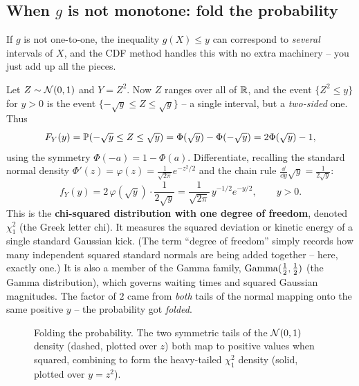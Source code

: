 \subsection{When $g$ is not monotone: fold the probability}

If $g$ is not one-to-one, the inequality $g(X)\le y$ can correspond to \emph{several}
intervals of $X$, and the CDF method handles this with no extra machinery -- you just add
up all the pieces.

\begin{example}[$Y = X^2$ for a standard normal -- the chi-squared]
\label{ch16:normal-square}
Let $Z \sim \Normal(0,1)$ and $Y = Z^2$. Now $Z$ ranges over all of $\R$, and the event
$\{Z^2 \le y\}$ for $y > 0$ is the event $\{-\sqrt{y} \le Z \le \sqrt{y}\}$ -- a single
interval, but a \emph{two-sided} one. Thus
\[
  F_Y(y) = \P(-\sqrt{y} \le Z \le \sqrt{y}) = \Phi(\sqrt{y}) - \Phi(-\sqrt{y})
         = 2\Phi(\sqrt{y}) - 1,
\]
using the symmetry $\Phi(-a) = 1 - \Phi(a)$. Differentiate, recalling
the standard normal density $\Phi'(z) = \varphi(z) = \tfrac{1}{\sqrt{2\pi}}e^{-z^2/2}$ and the chain rule
$\tfrac{\dd}{\dd y}\sqrt{y} = \tfrac{1}{2\sqrt{y}}$:
\[
  f_Y(y) = 2\,\varphi(\sqrt{y})\cdot \frac{1}{2\sqrt{y}}
         = \frac{1}{\sqrt{2\pi}}\, y^{-1/2} e^{-y/2}, \qquad y > 0.
\]
This is the \textbf{chi-squared distribution with one degree of freedom}, denoted $\chi^2_1$ (the Greek letter chi).
It measures the squared deviation or kinetic energy of a single standard Gaussian kick. (The
term ``degree of freedom'' simply records how many independent squared standard normals are
being added together -- here, exactly one.) It is also a member of the Gamma family,
$\Gam(\tfrac12,\tfrac12)$ (the Gamma distribution), which governs waiting times and squared Gaussian magnitudes.
The factor of $2$ came from \emph{both} tails of the normal mapping onto the same positive
$y$ -- the probability got \emph{folded}.
\end{example}

\begin{figure}[H]
\centering
{}
\caption{Folding the probability. The two symmetric tails of the $\Normal(0,1)$ density (dashed, plotted over $z$) both map to positive values when squared, combining to form the heavy-tailed $\chi^2_1$ density (solid, plotted over $y=z^2$).}
\label{ch16:fig-fold}
\end{figure}


